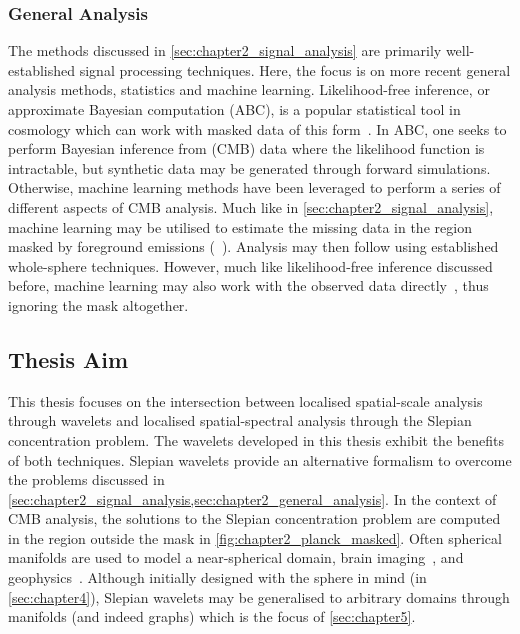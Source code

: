 \subsubsection{General Analysis}\label{sec:chapter2_general_analysis}

The methods discussed in \cref{sec:chapter2_signal_analysis} are primarily well-established signal processing techniques.
Here, the focus is on more recent general analysis methods, \ie{} statistics and machine learning.
Likelihood-free inference, or approximate Bayesian computation (ABC), is a popular statistical tool in cosmology which can work with masked data of this form~\cite{Schafer2012,Alsing2018,Alsing2019}.
In ABC, one seeks to perform Bayesian inference from (CMB) data where the likelihood function is intractable, but synthetic data may be generated through forward simulations.
Otherwise, machine learning methods have been leveraged to perform a series of different aspects of CMB analysis.
Much like in \cref{sec:chapter2_signal_analysis}, machine learning may be utilised to estimate the missing data in the region masked by foreground emissions (\eg{}~\cite{Puglisi2020,Petroff2020,VafaeiSadr2021}).
Analysis may then follow using established whole-sphere techniques.
However, much like likelihood-free inference discussed before, machine learning may also work with the observed data directly~\cite{Chanda2021}, thus ignoring the mask altogether.

\subsection{Thesis Aim}\label{sec:chapter2_thesis_aim}

This thesis focuses on the intersection between localised spatial-scale analysis through wavelets and localised spatial-spectral analysis through the Slepian concentration problem.
The wavelets developed in this thesis exhibit the benefits of both techniques.
Slepian wavelets provide an alternative formalism to overcome the problems discussed in \cref{sec:chapter2_signal_analysis,sec:chapter2_general_analysis}.
In the context of CMB analysis, the solutions to the Slepian concentration problem are computed in the region outside the mask in \cref{fig:chapter2_planck_masked}.
Often spherical manifolds are used to model a near-spherical domain, \eg{} brain imaging~\cite{Hammond2011}, and geophysics~\cite{Pavlis2013}.
Although initially designed with the sphere in mind (in \cref{sec:chapter4}), Slepian wavelets may be generalised to arbitrary domains through manifolds (and indeed graphs) which is the focus of \cref{sec:chapter5}.
